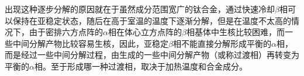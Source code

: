 出现这种逐步分解的原因就在于虽然成分范围宽广的钛合金，通过快速冷却$\beta$相可以保持在亚稳定状态，随后在高于室温的温度下逐渐分解，但是在温度不太高的情况下，由于密排六方点阵的$\alpha$相在体心立方点阵的$\beta$相基体中生核比较困难，而一些中间分解产物比较容易生核，因此，亚稳定$\beta$相不能直接分解形成平衡的$\alpha$相，而是经过一些中间分解过程，由生成的一些中间分解产物（或称过渡相）再转变为平衡的$\alpha$相。至于形成哪一种过渡相，取决于加热温度和合金成分。
%
%
%
%
%
